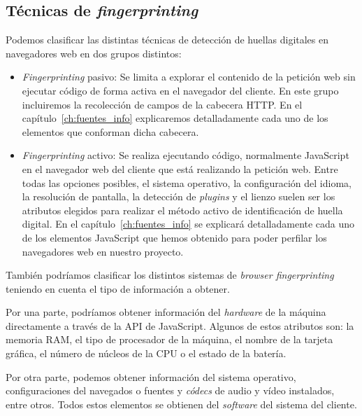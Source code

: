 \subsection{Técnicas de \textit{fingerprinting}}

Podemos clasificar las distintas técnicas de detección de huellas digitales en navegadores web en dos grupos distintos: \par 

\begin{itemize}
	\item \textit{Fingerprinting} pasivo: Se limita a explorar el contenido de la petición web sin ejecutar código de forma activa en el navegador del cliente. En este grupo incluiremos la recolección de campos de la cabecera HTTP. En el capítulo~\ref{ch:fuentes_info} explicaremos detalladamente cada uno de los elementos que conforman dicha cabecera. \par 
	
	\item \textit{Fingerprinting} activo:  Se realiza ejecutando código, normalmente JavaScript en el navegador web del cliente que está realizando la petición web. Entre todas las opciones posibles, el sistema operativo, la configuración del idioma, la resolución de pantalla, la detección de \textit{plugins} y el lienzo suelen ser los atributos elegidos para realizar el método activo de identificación de huella digital. En el capítulo~\ref{ch:fuentes_info} se explicará detalladamente cada uno de los elementos JavaScript que hemos obtenido para poder perfilar los navegadores web en nuestro proyecto. \par 
	
\end{itemize}

También podríamos clasificar los distintos sistemas de \textit{browser fingerprinting} teniendo en cuenta el tipo de información a obtener. \par 

Por una parte, podríamos obtener información del \textit{hardware} de la máquina directamente a través de la API de JavaScript. Algunos de estos atributos son: la memoria RAM, el tipo de procesador de la máquina, el nombre de la tarjeta gráfica, el número de núcleos de la CPU o el estado de la batería. \par

Por otra parte, podemos obtener información del sistema operativo, configuraciones del navegados o fuentes y \textit{códecs} de audio y vídeo instalados, entre otros. Todos estos elementos se obtienen del \textit{software} del sistema del cliente. \par 

